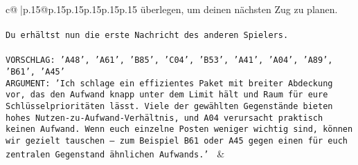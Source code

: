 \documentclass{article}
\begin{document}
{\begin{supertabular}{c@{$\;$}|p{.15\linewidth}@{}p{.15\linewidth}p{.15\linewidth}p{.15\linewidth}p{.15\linewidth}p{.15\linewidth}}
{{{überlegen, um deinen nächsten Zug zu planen.\\ \tt \\ \tt Du erhältst nun die erste Nachricht des anderen Spielers.\\ \tt \\ \tt VORSCHLAG: {'A48', 'A61', 'B85', 'C04', 'B53', 'A41', 'A04', 'A89', 'B61', 'A45'}\\ \tt ARGUMENT: {'Ich schlage ein effizientes Paket mit breiter Abdeckung vor, das den Aufwand knapp unter dem Limit hält und Raum für eure Schlüsselprioritäten lässt. Viele der gewählten Gegenstände bieten hohes Nutzen-zu-Aufwand-Verhältnis, und A04 verursacht praktisch keinen Aufwand. Wenn euch einzelne Posten weniger wichtig sind, können wir gezielt tauschen – zum Beispiel B61 oder A45 gegen einen für euch zentralen Gegenstand ähnlichen Aufwands.'} 
	  } 
	   } 
	   } 
	 & \\ 
 

    \theutterance {}  


\end{supertabular}}
\end{document}
